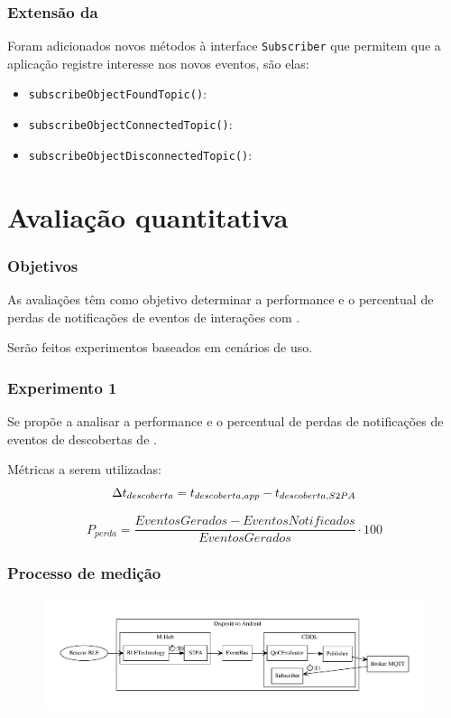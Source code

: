 \documentclass[aspectratio=169]{beamer}
\begin{document}
\begin{frame}
	\frametitle{Extensão da \api}
	Foram adicionados novos métodos à interface \texttt{Subscriber} que permitem que a aplicação registre interesse nos novos eventos, são elas:
	\begin{itemize}
		\item \texttt{subscribeObjectFoundTopic()}:

		\item \texttt{subscribeObjectConnectedTopic()}:

		\item \texttt{subscribeObjectDisconnectedTopic()}:
	\end{itemize}
\end{frame}


\section{Avaliação quantitativa}


\begin{frame}
	\frametitle{Objetivos}
	As avaliações têm como objetivo determinar a performance e o percentual de perdas de notificações de eventos de interações com \smartobjs.

	\bigskip

	Serão feitos experimentos baseados em cenários de uso.
\end{frame}

\begin{frame}
	\frametitle{Experimento 1}
	Se propõe a analisar a performance e o percentual de perdas de notificações de eventos de descobertas de \smartobjs.

	\bigskip
	
	Métricas a serem utilizadas:
	\begin{equation}
		\label{equ:performance-discovery}
		\Delta t_{descoberta} = t_{descoberta,app} - t_{descoberta,S2PA}
	\end{equation}
	
	\begin{equation}
		\label{equ:acuracy}
		P_{perda} = \frac{EventosGerados - EventosNotificados}{EventosGerados} \cdot 100
	\end{equation}
\end{frame}

\begin{frame}
	\frametitle{Processo de medição}
	\begin{figure}
		\centering
		\includegraphics[width=.85\linewidth]{img/performance-annotation.pdf}
	\end{figure}
\end{frame}
\end{document}
